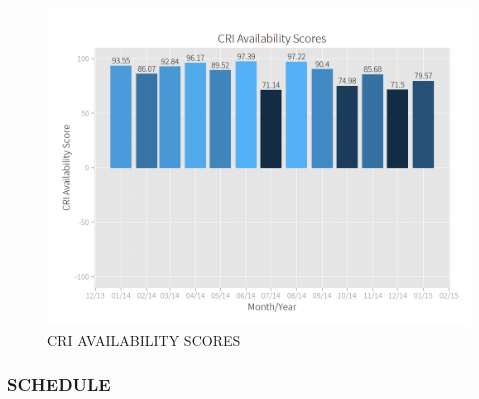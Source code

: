 \documentclass[SDSUThesis.tex]{subfiles}
\begin{document}
            \begin{figure}[ht]
                \centering
                \includegraphics[scale=.3]{images/availability_scores.png}
                \caption{CRI AVAILABILITY SCORES}
                \label{fig:availability-scores}
            \end{figure}
            
            
            
            
            
        \subsubsection{SCHEDULE}
\end{document}
